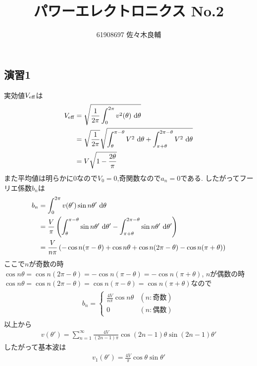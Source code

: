 \documentclass[uplatex,a4j,11pt,dvipdfmx]{jsarticle}
\begin{document}
\title{パワーエレクトロニクス No.2}
\author{61908697 佐々木良輔}
\date{}
\maketitle
\subsection*{演習1}
実効値$V_{\rm eff}$は
\begin{align}
  \begin{split}
    V_{\rm eff}&=\sqrt{\frac{1}{2\pi}\int_0^{2\pi}v^2(\theta)\ {\rm d}\theta}\\
    &=\sqrt{\frac{1}{2\pi}}\sqrt{\int_\theta^{\pi-\theta}V^2\ {\rm d}\theta+\int^{2\pi-\theta}_{\pi+\theta}V^2\ {\rm d}\theta}\\
    &=V\sqrt{1-\frac{2\theta}{\pi}}
  \end{split}
\end{align}
また平均値は明らかに0なので$V_0=0$,奇関数なので$a_n=0$である.
したがってフーリエ係数$b_n$は
\begin{align}
  \begin{split}
    b_n&=\int_0^{2\pi}v(\theta')\sin n\theta'\ {\rm d}\theta\\
    &=\frac{V}{\pi}\left(\int_\theta^{\pi-\theta}\sin n\theta'\ {\rm d}\theta'-\int_{\pi+\theta}^{2\pi-\theta}\sin n\theta'\ {\rm d}\theta'\right)\\
    &=\frac{V}{n\pi}\left(-\cos n(\pi-\theta)+\cos n\theta+\cos n(2\pi-\theta)-\cos n(\pi+\theta)\right)
  \end{split}
\end{align}
ここで$n$が奇数の時$\cos n\theta=\cos n(2\pi-\theta)=-\cos n(\pi-\theta)=-\cos n(\pi+\theta)$,
$n$が偶数の時$\cos n\theta=\cos n(2\pi-\theta)=\cos n(\pi-\theta)=\cos n(\pi+\theta)$なので
\begin{align}
  \begin{split}
    b_n=\begin{cases}
      \frac{4V}{n\pi}\cos n\theta & (n:奇数)\\
      0 & (n:偶数)
    \end{cases}
  \end{split}
\end{align}
以上から
\begin{align}
  v(\theta')=\sum_{n=1}^{\infty} \frac{4V}{(2n-1)\pi}\cos(2n-1)\theta\sin(2n-1)\theta'
\end{align}
したがって基本波は
\begin{align}
  v_1(\theta')=\frac{4V}{\pi}\cos\theta\sin\theta'
\end{align}
\end{document}
